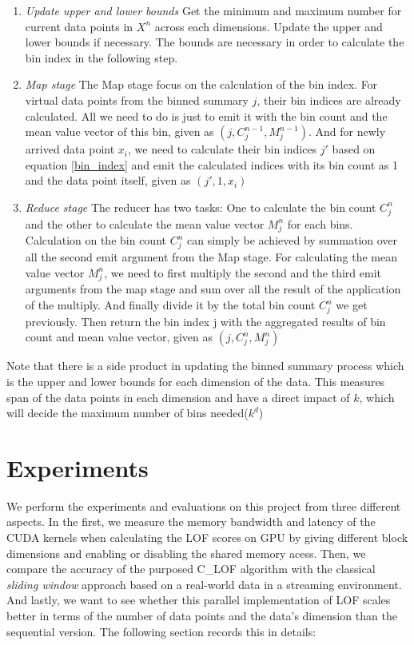 \documentclass[11pt]{article}       %
\begin{document}
\begin{enumerate}
 \item {\textit{Update upper and lower bounds}}
 	Get the minimum and maximum number for current data points in $X^n$ across each dimensions. Update the upper and lower bounds if necessary. The bounds are necessary in order to calculate the bin index in the following step.
 \item {\textit{Map stage}}
 	The Map stage focus on the calculation of the bin index. For virtual data points from the binned summary $j$, their bin indices are already calculated. All we need to do is just to emit it with the bin count and the mean value vector of this bin, given as $(j, C_j^{n-1}, M_j^{n-1})$. And for newly arrived data point $x_i$, we need to calculate their bin indices $j'$ based on equation \ref{bin_index} and emit the calculated indices with its bin count as 1 and the data point itself, given as ${(j', 1, x_i)}$
\item {\textit{Reduce stage}}
	The reducer has two tasks: One to calculate the bin count $C_j^n$ and the other to calculate the mean value vector $M_j^n$ for each bins. Calculation on the bin count $C_j^n$ can simply be achieved by summation over all the second emit argument from the Map stage. For calculating the mean value vector $M_j^n$, we need to first multiply the second and the third emit arguments from the map stage and sum over all the result of the application of the multiply. And finally divide it by the total bin count $C_j^n$ we get previously. Then return the bin index j with the aggregated results of bin count and mean value vector, given as $(j, C_j^n, M_j^{n})$
\end{enumerate}

Note that there is a side product in updating the binned summary process which is the upper and lower bounds for each dimension of the data. This measures span of the data points in each dimension and have a direct impact of $k$, which will decide the maximum number of bins needed($k^d$)

\section{Experiments} \label{expert}

We perform the experiments and evaluations on this project from three different aspects. In the first, we measure the memory bandwidth and latency of the CUDA kernels when calculating the LOF scores on GPU by giving different block dimensions and enabling or disabling the shared memory acess. Then, we compare the accuracy of the purposed C\_LOF algorithm with the classical \textit{sliding window} approach based on a real-world data in a streaming environment. And lastly, we want to see whether this parallel implementation of LOF scales better in terms of the number of data points and the data's dimension than the sequential version. The following section records this in details: 
\end{document}
